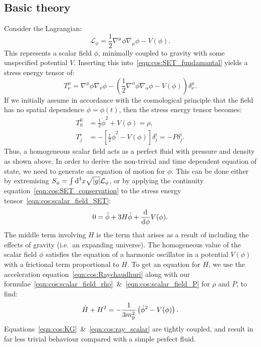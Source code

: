 \subsection{Basic theory}
Consider the Lagrangian:
\begin{equation}
  \mathcal{L}_\phi = \frac{1}{2}\nabla^\mu\phi\nabla_\mu\phi - V(\phi).
  \label{eqn:cos:scalar_field_lagrangian}
\end{equation}
This represents a scalar field \(\phi\), minimally coupled to gravity with some unspecified potential \(V\).  Inserting this into~\eqref{eqn:cos:SET_fundamantal} yields a stress energy tensor of:
\begin{equation}
  T^{\mu}_{\nu} = \nabla^\mu\phi\nabla_\nu\phi - \left( \frac{1}{2}\nabla^\alpha\phi \nabla_\alpha\phi - V(\phi)  \right)\delta^{\mu}_{\nu}.
  \label{eqn:cos:scalar_field_SET}
\end{equation}
If we initially assume in accordance with the cosmological principle that the field has no spatial dependence \(\phi = \phi(t)\), then the stress energy tensor becomes:
\begin{align}
  T^{0}_{0} &=\frac{1}{2}\dot\phi^2 + V(\phi) = \rho,
  \label{eqn:cos:scalar_field_rho}\\
  T^{i}_{j} &=-\left[ \frac{1}{2}\dot\phi^2 - V(\phi)\right]\delta^{i}_{j} = -P\delta^{i}_{j}.
  \label{eqn:cos:scalar_field_P}
\end{align}
Thus, a homogeneous scalar field acts as a perfect fluid with pressure and density as shown above. In order to derive the non-trivial and time dependent equation of state, we need to generate an equation of motion for \(\phi\). This can be done either by extremising \(S_\phi = \int \d[4]{x} \sqrt{|g|} \mathcal{L}_\phi\), or by applying the continuity equation~\eqref{eqn:cos:SET_conservation} to the stress energy tensor~\eqref{eqn:cos:scalar_field_SET}: 
\begin{equation}
  0 = \ddot{\phi} + 3 H \dot{\phi} + \frac{\d{}}{\d{\phi}}V(\phi).
  \label{eqn:cos:KG}
\end{equation}
The middle term involving \(H\) is the term that arises as a result of including the effects of gravity (i.e.\ an expanding universe). The homogeneous value of the scalar field \(\phi\) satisfies the equation of a harmonic oscillator in a potential \(V(\phi)\) with a frictional term proportional to \(H\).
To get an equation for \(H\), we use the acceleration equation~\eqref{eqn:cos:Raychaudhuri} along with our formulae~\eqref{eqn:cos:scalar_field_rho}~\&~\eqref{eqn:cos:scalar_field_P} for \(\rho\) and \(P\), to find:
\begin{equation}
  \dot{H}+H^2 = -\frac{1}{3\m^2}\left(\dot{\phi}^2-V(\phi)\right).
  \label{eqn:cos:ray_scalar}
\end{equation}
Equations~\eqref{eqn:cos:KG}~\&~\eqref{eqn:cos:ray_scalar} are tightly coupled, and result in far less trivial behaviour compared with a simple perfect fluid.


